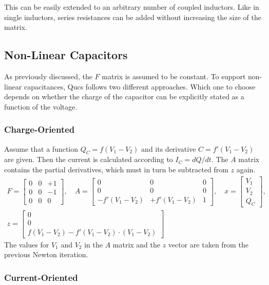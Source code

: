 This can be easily extended to an arbitrary number of coupled
inductors.  Like in single inductors, series resistances can be added
without increasing the size of the matrix.

\subsection{Non-Linear Capacitors}

As previously discussed, the $F$ matrix is assumed to be constant.
To support non-linear capacitances, Qucs follows two different
approaches.  Which one to choose depends on whether the charge of the
capacitor can be explicitly stated as a function of the voltage.

\subsubsection{Charge-Oriented}

Assume that a function $Q_C=f(V_1-V_2)$ and its derivative
$C=f'(V_1-V_2)$ are given.  Then the current is calculated according
to $I_C=dQ/dt$.  The $A$ matrix contains the partial derivatives,
which must in turn be subtracted from $z$ again.
\begin{equation}
\begin{gathered}
F=
\begin{bmatrix}
0 & 0 & +1\\
0 & 0 & -1\\
0 & 0 & 0
\end{bmatrix},\quad
A=
\begin{bmatrix}
0 & 0 & 0\\
0 & 0 & 0\\
-f'(V_1-V_2) & +f'(V_1-V_2) & 1
\end{bmatrix},\quad
x=
\begin{bmatrix}
V_1\\
V_2\\
Q_C
\end{bmatrix},\\
z=
\begin{bmatrix}
0\\
0\\
f(V_1-V_2)-f'(V_1-V_2)\cdot(V_1-V_2)
\end{bmatrix}
\end{gathered}
\end{equation}
The values for $V_1$ and $V_2$ in the $A$ matrix and the $z$ vector
are taken from the previous Newton iteration.

\subsubsection{Current-Oriented}

